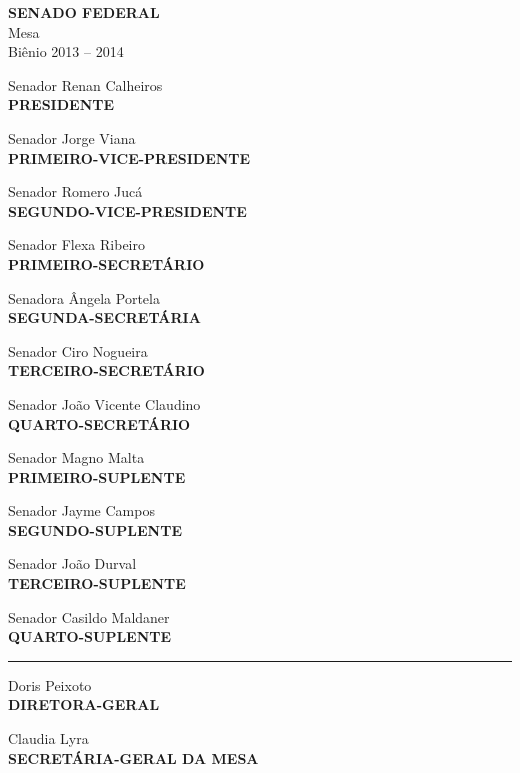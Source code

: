 \documentclass[a4paper,11pt,openright,twoside,english,brazil]{abntex2}
\begin{document}
\vspace*{\fill}
{
\centering
\setlength{\parindent}{0cm}
\setlength{\parskip}{0.5cm}  %

\ABNTEXchapterfont

{
\large
\textbf{SENADO FEDERAL}\\
Mesa\\
Biênio 2013 -- 2014\\
}

\vspace*{\parskip}
Senador Renan Calheiros\\
\textbf{PRESIDENTE}\\


\begin{multicols}{2}

Senador Jorge Viana\\
\textbf{PRIMEIRO-VICE-PRESIDENTE}

Senador Romero Jucá\\
\textbf{SEGUNDO-VICE-PRESIDENTE}

Senador Flexa Ribeiro\\
\textbf{PRIMEIRO-SECRETÁRIO}

\columnbreak

Senadora Ângela Portela\\
\textbf{SEGUNDA-SECRETÁRIA}

Senador Ciro Nogueira\\
\textbf{TERCEIRO-SECRETÁRIO}

Senador João Vicente Claudino\\
\textbf{QUARTO-SECRETÁRIO}

\end{multicols}

Senador Magno Malta\\
\textbf{PRIMEIRO-SUPLENTE}

Senador Jayme Campos\\
\textbf{SEGUNDO-SUPLENTE}

Senador João Durval\\
\textbf{TERCEIRO-SUPLENTE}

Senador Casildo Maldaner\\
\textbf{QUARTO-SUPLENTE}

\rule{5cm}{\ABNTEXsignthickness}%

Doris Peixoto\\
\textbf{DIRETORA-GERAL}

Claudia Lyra\\
\textbf{SECRETÁRIA-GERAL DA MESA}

}
\vspace*{\fill}


\end{document}
